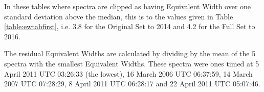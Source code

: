\begin{table}[!htbp]
\centering
{}
\caption{This table shows the 5 highest peaks from the periodograms for Equivalent Widths with various treatments of the
  Full Set of data to March 2916.}
\protect\label{table:fullewtaball}
\end{table}

In these tables where spectra are clipped as having Equivalent Width over one standard deviation above the median, this
is to the values given in Table \ref{table:ewtabfirst}, i.e. 3.8 for the Original Set to 2014 and 4.2 for the Full Set
to 2016.

The residual Equivalent Widths are calculated by dividing by the mean of the 5 spectra with the smallest {\ha}
Equivalent Widths. These spectra were ones timed at 5 April 2011 UTC 03:26:33 (the lowest), 16 March 2006 UTC 06:37:59,
14 March 2007 UTC 07:28:29, 8 April 2011 UTC 06:28:17 and 22 April 2011 UTC 05:07:46.


